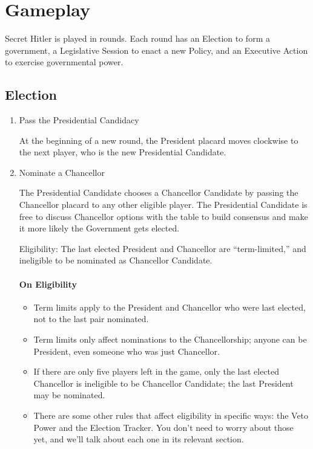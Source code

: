 \documentclass[13pt,a4paper,twocolumn,titlepage]{scrartcl}
\begin{document}
	\section*{Gameplay}
	Secret Hitler is played in rounds. Each round has an \textcolor{Blue3}{Election} to form a government, a \textcolor{Blue3}{Legislative Session} to enact a new Policy, and an \textcolor{Blue3}{Executive Action} to exercise governmental power.
	\subsection*{Election}
	\begin{enumerate}
		\item \textcolor{Blue3}{Pass the Presidential Candidacy}
		
		At the beginning of a new round, the President placard moves clockwise to the next player, who is the new Presidential Candidate.
		
		\item \textcolor{Blue3}{Nominate a Chancellor}
		
		The Presidential Candidate chooses a Chancellor Candidate by passing the Chancellor placard to any other eligible player. The Presidential Candidate is free to discuss Chancellor options with the table to build consensus and make it more likely the Government gets elected.
		
		\textcolor{Blue3}{Eligibility:} The last elected President and Chancellor are
		“term-limited,” and ineligible to be nominated
		as Chancellor Candidate.
		
		\vspace*{-8mm}
		\paragraph{\textcolor{SeaGreen4}{On Eligibility}}
		\textcolor{SeaGreen4}
		{
			\begin{itemize}
				\item Term limits apply to the President and Chancellor who were last elected, not to the last pair nominated.
				\item Term limits only affect nominations to the Chancellorship; anyone can be President, even	someone who was just Chancellor.
				\item If there are only five players left in the game,​ only the last elected ​Chancellor is ineligible to be Chancellor Candidate; the last President may be nominated.
				\item There are some other rules that affect eligibility in specific ways: the Veto Power and the Election Tracker. You don’t need to worry about those yet, and we’ll talk about each one in its relevant section.
			\end{itemize}
		}
		

\end{enumerate}
\end{document}
